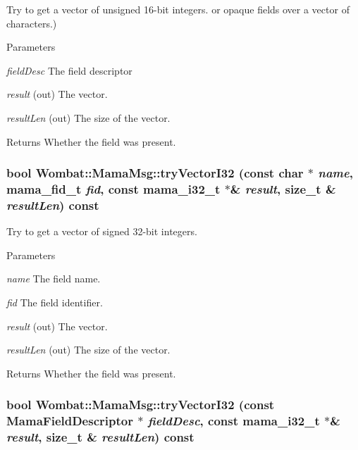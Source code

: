 Try to get a vector of unsigned 16-\/bit integers. or opaque fields over a vector of characters.) 
\begin{DoxyParams}{Parameters}
\item[{\em fieldDesc}]The field descriptor \item[{\em result}](out) The vector. \item[{\em resultLen}](out) The size of the vector. \end{DoxyParams}
\begin{DoxyReturn}{Returns}
Whether the field was present. 
\end{DoxyReturn}
\hypertarget{classWombat_1_1MamaMsg_acd38982a9a653073418887744e770e1f}{
\subsubsection[{tryVectorI32}]{\setlength{\rightskip}{0pt plus 5cm}bool Wombat::MamaMsg::tryVectorI32 (const char $\ast$ {\em name}, \/  mama\_\-fid\_\-t {\em fid}, \/  const mama\_\-i32\_\-t $\ast$\& {\em result}, \/  size\_\-t \& {\em resultLen}) const}}
\label{classWombat_1_1MamaMsg_acd38982a9a653073418887744e770e1f}


Try to get a vector of signed 32-\/bit integers. 
\begin{DoxyParams}{Parameters}
\item[{\em name}]The field name. \item[{\em fid}]The field identifier. \item[{\em result}](out) The vector. \item[{\em resultLen}](out) The size of the vector. \end{DoxyParams}
\begin{DoxyReturn}{Returns}
Whether the field was present. 
\end{DoxyReturn}
\hypertarget{classWombat_1_1MamaMsg_ae764d0d314b85be7270738fcd7715fe7}{
\subsubsection[{tryVectorI32}]{\setlength{\rightskip}{0pt plus 5cm}bool Wombat::MamaMsg::tryVectorI32 (const {\bf MamaFieldDescriptor} $\ast$ {\em fieldDesc}, \/  const mama\_\-i32\_\-t $\ast$\& {\em result}, \/  size\_\-t \& {\em resultLen}) const}}
\label{classWombat_1_1MamaMsg_ae764d0d314b85be7270738fcd7715fe7}



